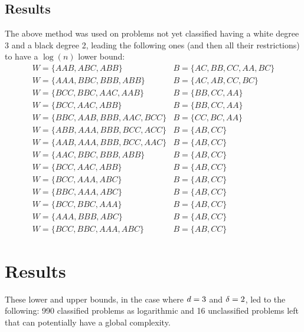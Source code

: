 \subsection{Results}
The above method was used on problems not yet classified having a white degree 3 and a black degree 2, leading the following ones (and then all their restrictions) to have a $\log(n)$ lower bound:\\
$$\begin{array}{ll}
    W =\{AAB,ABC,ABB\} & B = \{AC, BB, CC, AA, BC\}\\
    W = \{AAA,BBC,BBB,ABB\} & B = \{AC, AB, CC, BC\}\\
    W = \{BCC,BBC,AAC,AAB\}& B = \{BB, CC, AA\}\\
    W = \{BCC,AAC,ABB\} & B = \{BB, CC, AA\}\\
    W = \{BBC,AAB,BBB,AAC,BCC\}& B = \{CC, BC, AA\}\\
    W = \{ABB,AAA,BBB,BCC,ACC\}& B = \{AB, CC\}\\
    W = \{AAB,AAA,BBB,BCC,AAC\}& B = \{AB, CC\}\\
    W = \{AAC,BBC,BBB,ABB\}& B = \{AB, CC\}\\
    W = \{BCC,AAC,ABB\}& B = \{AB, CC\}\\
    W = \{BCC,AAA,ABC\}& B = \{AB, CC\}\\
    W = \{BBC,AAA,ABC\}& B = \{AB, CC\}\\
    W = \{BCC,BBC,AAA\}& B = \{AB, CC\}\\
    W = \{AAA,BBB,ABC\}& B = \{AB, CC\}\\
    W = \{BCC,BBC,AAA,ABC\}& B = \{AB, CC\}
\end{array}$$

\section{Results}
These lower and upper bounds, in the case where $d = 3$ and $\delta = 2$, led to the following: 990 classified problems as logarithmic and 16 unclassified problems left that can potentially have a global complexity.